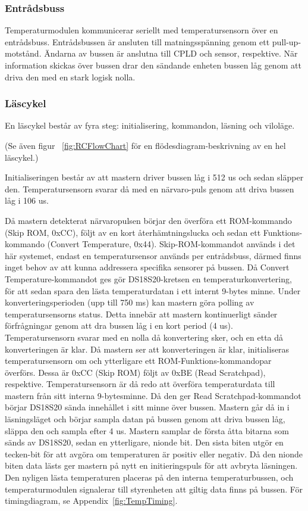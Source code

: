 \documentclass[a4paper,11pt]{article}
\begin{document}
	\subsubsection{Entrådsbuss}

	Temperaturmodulen kommunicerar seriellt med temperatursensorn över en entrådsbuss.
	Entrådsbussen är ansluten till matningsspänning genom ett pull-up-motstånd.
	Ändarna av bussen är anslutna till CPLD och sensor, respektive. När information
	skickas över bussen drar den sändande enheten bussen låg genom att driva den
	med en stark logisk nolla.

	\subsubsection{Läscykel}

	En läscykel består av fyra steg: initialisering, kommandon, läsning och viloläge.

	(Se även figur ~\ref{fig:RCFlowChart} för en flödesdiagram-beskrivning av en hel läscykel.)

	Initialiseringen består av att mastern driver bussen låg i 512 us och sedan släpper den.
	Temperatursensorn svarar då med en närvaro-puls genom att driva bussen låg i 106 us.

	Då mastern detekterat närvaropulsen börjar den överföra ett ROM-kommando (Skip ROM, 0xCC), följt av en kort återhämtningslucka och sedan ett Funktions-kommando (Convert Temperature, 0x44).
	Skip-ROM-kommandot används i det här systemet, endast en temperatursensor används per entrådsbuss, därmed finns inget behov av att kunna addressera specifika sensorer på bussen.
	Då Convert Temperature-kommandot ges gör DS18S20-kretsen en temperaturkonvertering, för att sedan spara den lästa temperaturdatan i ett internt 9-bytes minne.
	Under konverteringsperioden (upp till 750 ms) kan mastern göra polling av temperatursensorns status. Detta innebär att mastern kontinuerligt
	sänder förfrågningar genom att dra bussen låg i en kort period (4 us). Temperatursensorn svarar med en nolla
	då konvertering sker, och en etta då konverteringen är klar.
	Då mastern ser att konverteringen är klar, initialiseras temperatursensorn om och ytterligare ett ROM-Funktions-kommandopar överförs. Dessa är 0xCC (Skip ROM) följt av 0xBE (Read Scratchpad), respektive.
	Temperatursensorn är då redo att överföra temperaturdata till mastern från sitt interna 9-bytesminne.
	Då den ger Read Scratchpad-kommandot börjar DS18S20 sända innehållet i sitt minne över bussen.
	Mastern går då in i läsningsläget och börjar sampla datan på bussen genom att driva bussen låg, släppa den och sampla efter 4 us.
	Mastern samplar de första åtta bitarna som sänds av DS18S20, sedan en ytterligare, nionde bit. 
	Den sista biten utgör en tecken-bit för att avgöra om temperaturen är positiv eller negativ. Då den nionde biten data lästs
	ger mastern på nytt en initieringspuls för att avbryta läsningen.
	Den nyligen lästa temperaturen placeras på den interna temperaturbussen, och temperaturmodulen signalerar till styrenheten att giltig data finns på bussen. För timingdiagram, se Appendix~\ref{fig:TempTiming}.
\end{document}
